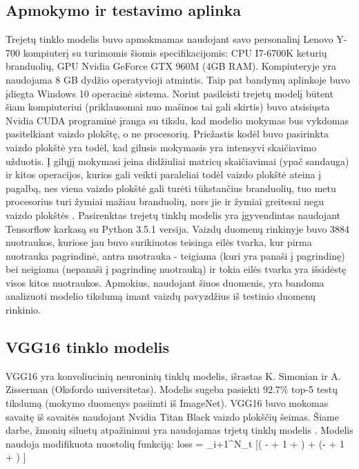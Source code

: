 \documentclass{VUMIFPSkursinis}
\let\[\relax \let\]\relax %
\DeclareRobustCommand{\[}{\begin{equation}}
\DeclareRobustCommand{\]}{\end{equation}}
\begin{document}
\subsection{Apmokymo ir testavimo aplinka}
Trejetų tinklo modelis buvo apmokmamas naudojant  savo personalinį Lenovo Y-700 kompiuterį su turimomis šiomis specifikacijomis: CPU I7-6700K keturių  branduolių, GPU Nvidia GeForce GTX 960M (4GB RAM). Kompiuteryje yra naudojama 8 GB
dydžio operatyvioji atmintis. Taip pat bandymų aplinkoje buvo įdiegta Windows 10 operacinė sistema. Norint pasileisti trejetų modelį būtent šiam kompiuteriui (priklausomai nuo mašinos tai gali skirtis) buvo atsisiųsta Nvidia CUDA programinė įranga su tikslu, kad modelio mokymas bus vykdomas pasitelkiant vaizdo plokštę, o ne procesorių.
\newline
Priežastis kodėl buvo pasirinkta vaizdo plokštė yra todėl, kad gilusis mokymasis yra intensyvi skaičiavimo užduotis. Į gilųjį mokymasi įeina didžiuliai matricų skaičiavimai (ypač sandauga) ir kitos operacijos, kurios gali veikti paraleliai todėl vaizdo plokštė ateina į pagalbą, nes viena vaizdo plokštė gali turėti tūkstančius branduolių, tuo metu procesorius turi žymiai mažiau branduolių, nors jie ir žymiai greitesni negu vaizdo plokštės \cite{Performance_of_GPU}.
\newline
Pasirenktas trejetų tinklų modelis yra įgyvendintas naudojant Tensorflow karkasą su Python 3.5.1 versija.
\newline
Vaizdų duomenų rinkinyje buvo 3884 nuotraukos, kuriose jau buvo surikiuotos teisinga eilės tvarka, kur pirma nuotrauka pagrindinė, antra nuotrauka - teigiama (kuri yra panaši į pagrindinę) bei neigiama (nepanaši į pagrindinę nuotrauką) ir tokia eilės tvarka yra išsidėstę visos kitos nuotraukos.
Apmokius, naudojant šiuos duomenis, yra bandoma analizuoti modelio tikslumą imant vaizdų pavyzdžius iš testinio duomenų rinkinio.

\subsection{VGG16 tinklo modelis}
VGG16 yra konvoliucinių neuroninių tinklų modelis, išrastas K. Simonian ir A. Zisserman (Oksfordo universitetas). Modelis sugeba pasiekti 92.7\% top-5 testų tikslumą (mokymo duomenys pasiimti iš ImageNet). VGG16 buvo mokomas savaitę iš savaitės naudojant Nvidia Titan Black vaizdo plokščių šeimas.
Šiame darbe, žmonių siluetų atpažinimui yra naudojamas trjetų tinklų modelis \cite{Aerial_image_similarity}. Modelis naudoja modifikuota nuostolių funkciją: 
\[loss = \sum_{i+1}^{N_t} [\ln ( -  + 1 + \epsilon) + \ln(-  + 1 + \epsilon)  ] \]
\end{document}
